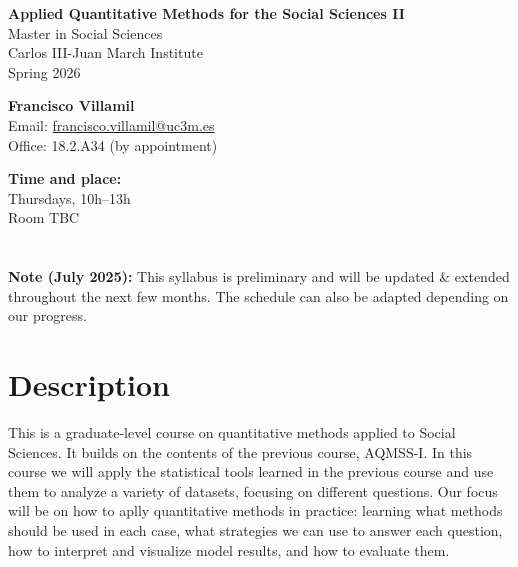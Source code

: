 \documentclass[12pt, a4paper]{article}
\begin{document}
\begin{center}
{\Large\bf Applied Quantitative Methods for the Social Sciences II}\\\vspace{10pt}
Master in Social Sciences\\Carlos III-Juan March Institute\\
\vspace{10pt}
{\large Spring 2026}\\
\end{center}

\vspace{15pt}

\begin{minipage}{0.6\textwidth}
\textbf{Francisco Villamil}\\
Email: \href{francisco.villamil@uc3m.es}{francisco.villamil@uc3m.es}\\
Office: 18.2.A34 (by appointment)
\end{minipage}\hfill
\begin{minipage}{0.39\textwidth}
\centering
\textbf{Time and place:}\\
Thursdays, 10h--13h\\Room TBC
\end{minipage}


\section*{}

\textbf{Note (July 2025):} This syllabus is preliminary and will be updated \& extended throughout the next few months. The schedule can also be adapted depending on our progress.

\section{Description}

This is a graduate-level course on quantitative methods applied to Social Sciences. It builds on the contents of the previous course, AQMSS-I. In this course we will apply the statistical tools learned in the previous course and use them to analyze a variety of datasets, focusing on different questions. Our focus will be on how to aplly quantitative methods in practice: learning what methods should be used in each case, what strategies we can use to answer each question, how to interpret and visualize model results, and how to evaluate them.
\end{document}
